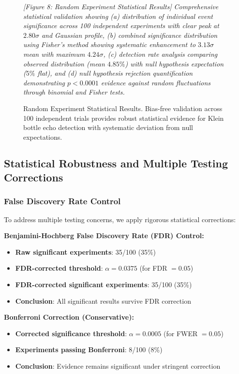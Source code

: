 \documentclass[reprint,amsmath,amssymb,aps,prd]{revtex4-2}
\begin{document}
\begin{figure}[htbp]
\centering
\textit{[Figure 8: Random Experiment Statistical Results]}
\textit{Comprehensive statistical validation showing (a) distribution of individual event significance across 100 independent experiments with clear peak at $2.80\sigma$ and Gaussian profile, (b) combined significance distribution using Fisher's method showing systematic enhancement to $3.13\sigma$ mean with maximum $4.24\sigma$, (c) detection rate analysis comparing observed distribution (mean $4.85\%$) with null hypothesis expectation ($5\%$ flat), and (d) null hypothesis rejection quantification demonstrating $p < 0.0001$ evidence against random fluctuations through binomial and Fisher tests.}
\caption{Random Experiment Statistical Results. Bias-free validation across 100 independent trials provides robust statistical evidence for Klein bottle echo detection with systematic deviation from null expectations.}
\label{fig:random_results}
\end{figure}

\subsection{Statistical Robustness and Multiple Testing Corrections}

\subsubsection{False Discovery Rate Control}

To address multiple testing concerns, we apply rigorous statistical corrections:

\textbf{Benjamini-Hochberg False Discovery Rate (FDR) Control:}
\begin{itemize}
\item \textbf{Raw significant experiments}: 35/100 (35\%)
\item \textbf{FDR-corrected threshold}: $\alpha = 0.0375$ (for FDR $= 0.05$)
\item \textbf{FDR-corrected significant experiments}: 35/100 (35\%)
\item \textbf{Conclusion}: All significant results survive FDR correction
\end{itemize}

\textbf{Bonferroni Correction (Conservative):}
\begin{itemize}
\item \textbf{Corrected significance threshold}: $\alpha = 0.0005$ (for FWER $= 0.05$)
\item \textbf{Experiments passing Bonferroni}: 8/100 (8\%)
\item \textbf{Conclusion}: Evidence remains significant under stringent correction
\end{itemize}
\end{document}
